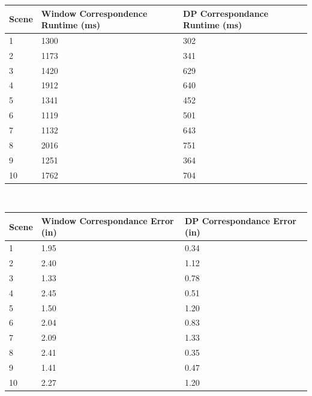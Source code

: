 \documentclass[11pt]{scrartcl}
\begin{document}
\begin{table}[H]
\begin{tabular}{lll}
\hline
Scene & Window Correspondence Runtime (ms) & DP Correspondance Runtime (ms) \\ \hline
1     & 1300                               & 302                            \\
2     & 1173                               & 341                            \\
3     & 1420                               & 629                            \\
4     & 1912                               & 640                            \\
5     & 1341                               & 452                            \\
6     & 1119                               & 501                            \\
7     & 1132                               & 643                            \\
8     & 2016                               & 751                            \\
9     & 1251                               & 364                            \\
10    & 1762                               & 704                            \\ \hline
\end{tabular}
\end{table}

\\
\begin{table}[H]
\begin{tabular}{lll}
\hline
Scene & Window Correspondance Error (in) & DP Correspondance Error (in) \\ \hline
1     & 1.95                             & 0.34                         \\
2     & 2.40                             & 1.12                         \\
3     & 1.33                             & 0.78                         \\
4     & 2.45                             & 0.51                         \\
5     & 1.50                             & 1.20                         \\
6     & 2.04                             & 0.83                         \\
7     & 2.09                             & 1.33                         \\
8     & 2.41                             & 0.35                         \\
9     & 1.41                             & 0.47                         \\
10    & 2.27                             & 1.20                         \\ \hline
\end{tabular}
\end{table}
\end{document}
